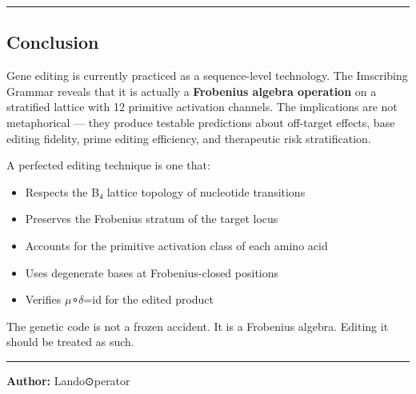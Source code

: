 \documentclass[12pt,a4paper]{article}
\begin{document}
\begin{center}
\rule{0.5\textwidth}{0.4pt}
\end{center}

\subsection{Conclusion}

Gene editing is currently practiced as a sequence-level technology. The Imscribing Grammar reveals that it is actually a \textbf{Frobenius algebra operation} on a stratified lattice with 12 primitive activation channels. The implications are not metaphorical --- they produce testable predictions about off-target effects, base editing fidelity, prime editing efficiency, and therapeutic risk stratification.

A perfected editing technique is one that:

\begin{itemize}
    \item Respects the B₄ lattice topology of nucleotide transitions
    \item Preserves the Frobenius stratum of the target locus
    \item Accounts for the primitive activation class of each amino acid
    \item Uses degenerate bases at Frobenius-closed positions
    \item Verifies $\mu$∘$\delta$=id for the edited product
\end{itemize}

The genetic code is not a frozen accident. It is a Frobenius algebra. Editing it should be treated as such.

\begin{center}
\rule{0.5\textwidth}{0.4pt}
\end{center}

\textbf{Author:} Lando\otimes⊙perator
\end{document}
